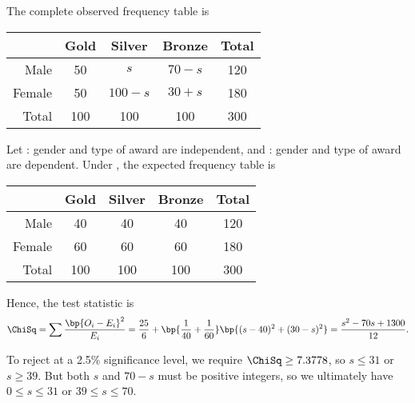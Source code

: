 \begin{solution}
    The complete observed frequency table is 
    \begin{table}[H]
        \centering
        \begin{tabular}{|r|c|c|c|c|}
        \hline
        \multicolumn{1}{|l|}{} & Gold & Silver & Bronze & Total \\ \hline
        Male & 50 & $s$ & $70-s$  & 120 \\ \hline
        Female & 50 & $100-s$ & $30+s$ & 180 \\ \hline
        Total & 100 & 100 & 100 & 300 \\ \hline
        \end{tabular}
    \end{table}

    Let \nullhyp: gender and type of award are independent, and \althyp: gender and type of award are dependent. Under \nullhyp, the expected frequency table is 
    \begin{table}[H]
        \centering
        \begin{tabular}{|r|c|c|c|c|}
        \hline
        \multicolumn{1}{|l|}{} & Gold & Silver & Bronze & Total \\ \hline
        Male & 40 & 40 & 40  & 120 \\ \hline
        Female & 60 & 60 & 60 & 180 \\ \hline
        Total & 100 & 100 & 100 & 300 \\ \hline
        \end{tabular}
    \end{table}
    Hence, the test statistic is \[\ChiSq = \sum \frac{\bp{O_i - E_i}^2}{E_i} = \frac{25}{6} + \bp{\frac1{40} + \frac1{60}} \bp{(s-40)^2 + (30-s)^2} = \frac{s^2 - 70s + 1300}{12}.\]

    To reject \nullhyp{} at a 2.5\% significance level, we require $\ChiSq \geq 7.3778$, so $s \leq 31$ or $s \geq 39$. But both $s$ and $70-s$ must be positive integers, so we ultimately have $0 \leq s \leq 31$ or $39 \leq s \leq 70$.
\end{solution}

